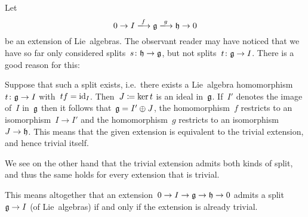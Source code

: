 \begin{warning}
  Let
  \[
    0
    \to
    I
    \xlongto{f}
    \glie
    \xlongto{g}
    \hlie
    \to
    0
  \]
  be an extension of Lie~algebras.
  The observant reader may have noticed that we have so far only considered splits~$s \colon \mathfrak{h} \to \mathfrak{g}$, but not splits~$t \colon \mathfrak{g} \to I$.
  There is a good reason for this:
  
  Suppose that such a split exists, i.e.\ there exists a Lie~algebra homomorphism~$t \colon \mathfrak{g} \to I$ with~$t f = \operatorname{id}_I$.
  Then~$J \coloneqq \ker t$ is an ideal in~$\mathfrak{g}$.
  If~$I'$ denotes the image of~$I$ in~$\mathfrak{g}$ then it follows that~$\mathfrak{g} = I' \oplus J$, the homomorphism~$f$ restricts to an isomorphism~$I \to I'$ and the homomorphism~$g$ restricts to an isomorphism~$J \to \mathfrak{h}$.
  This means that the given extension is equivalent to the trivial extension, and hence trivial itself.
  
  We see on the other hand that the trivial extension admits both kinds of split, and thus the same holds for every extension that is trivial.
  
  This means altogether that an extension~$0 \to I \to \mathfrak{g} \to \mathfrak{h} \to 0$ admits a split~$\mathfrak{g} \to I$ (of Lie~algebras) if and only if the extension is already trivial.
\end{warning}




